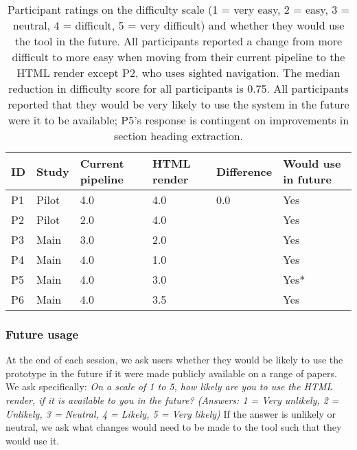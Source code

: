 \begin{table}[tb!]
    \centering
    \begin{tabular}{llp{12mm}p{12mm}lp{15mm}}
    \toprule
        \textbf{ID} & \textbf{Study} & \textbf{Current pipeline} & \textbf{HTML render} & \textbf{Difference} & \textbf{Would use in future} \\
    \midrule
        P1 & Pilot & 4.0 & 4.0 & 0.0 & Yes \\
        P2 & Pilot & 2.0 & 4.0 & \color{red}{-2.0} & Yes \\
    \midrule
        P3 & Main & 3.0 & 2.0 & \color{darkgreen}{1.0} & Yes \\
        P4 & Main & 4.0 & 1.0 & \color{darkgreen}{3.0} & Yes \\
        P5 & Main & 4.0 & 3.0 & \color{darkgreen}{1.0} & Yes* \\
        P6 & Main &4.0 & 3.5 & \color{darkgreen}{0.5} & Yes \\
    \bottomrule
    \end{tabular}
    \caption{Participant ratings on the difficulty scale (1 = very easy, 2 = easy, 3 = neutral, 4 = difficult, 5 = very difficult) and whether they would use the tool in the future. All participants reported a change from more difficult to more easy when moving from their current pipeline to the HTML render except P2, who uses sighted navigation. The median reduction in difficulty score for all participants is 0.75. All participants reported that they would be very likely to use the system in the future were it to be available; P5's response is contingent on improvements in section heading extraction.
    }
    \label{tab:taskload}
\end{table}

\subsubsection*{Future usage}

At the end of each session, we ask users whether they would be likely to use the prototype in the future if it were made publicly available on a range of papers. We ask specifically: \textit{On a scale of 1 to 5, how likely are you to use the HTML render, if it is available to you in the future? (Answers: 1 = Very unlikely, 2 = Unlikely, 3 = Neutral, 4 = Likely, 5 = Very likely)} If the answer is unlikely or neutral, we ask what changes would need to be made to the tool such that they would use it.

